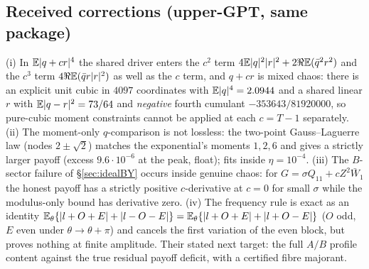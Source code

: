 \subsection{Received corrections (upper-GPT, same package)}
(i) In $\mathbb E|q+cr|^4$ the shared driver enters the $c^2$ term $4\mathbb E|q|^2|r|^2+2\Re\mathbb E(\bar q^2r^2)$ and the $c^3$ term $4\Re\mathbb E(\bar qr|r|^2)$ as well as the $c$ term, and $q+cr$ is mixed
chaos: there is an explicit unit cubic in $4097$ coordinates with $\mathbb E|q|^4=2.0944$ and a shared linear $r$ with $\mathbb E|q-r|^2=73/64$ and \emph{negative} fourth cumulant
$-353643/81920000$, so pure-cubic moment constraints cannot be applied at each $c=T-1$ separately. (ii) The moment-only $q$-comparison is not lossless: the two-point
Gauss--Laguerre law (nodes $2\pm\sqrt2$) matches the exponential's moments $1,2,6$ and gives a strictly larger payoff (excess $9.6\cdot10^{-6}$ at the peak, float); fits inside
$\eta=10^{-4}$. (iii) The $B$-sector failure of \S\ref{sec:idealBY} occurs inside genuine chaos: for $G=\sigma Q_{11}+cZ^2\bar W_1$ the honest payoff has a strictly positive
$c$-derivative at $c=0$ for small $\sigma$ while the modulus-only bound has derivative zero. (iv) The frequency rule is exact as an identity
$\mathbb E_\theta\{|l+O+E|+|l-O-E|\}=\mathbb E_\theta\{|l+O+E|+|l+O-E|\}$ ($O$ odd, $E$ even under $\theta\to\theta+\pi$) and cancels the first variation of the even block, but proves nothing at
finite amplitude. Their stated next target: the full $A/B$ profile content against the true residual payoff deficit, with a certified fibre majorant.
